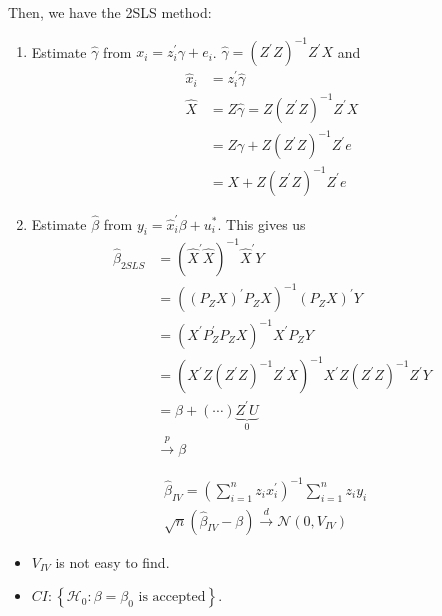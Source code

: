 \begin{eg}
    Then, we have the 2SLS method:
    \begin{enumerate}
        \item Estimate $\hat{\gamma}$ from $x_i = z_i^{\prime} \gamma + e_i$. $\hat{\gamma} = (Z^{\prime} Z)^{-1}Z^{\prime} X$ and 
            \begin{align*}
                \hat{x}_i &= z_i^{\prime} \hat{\gamma} \\
                \hat{X} &= Z \hat{\gamma} = Z(Z^{\prime} Z)^{-1}Z^{\prime} X \\
                &= Z \gamma + Z(Z^{\prime} Z)^{-1}Z^{\prime} e \\
                &= X + Z(Z^{\prime} Z)^{-1}Z^{\prime} e
            \end{align*}
        \item Estimate $\hat{\beta}$ from $y_i = \hat{x}_i^{\prime} \beta + u_i^*$. This gives us 
            \begin{align*}
                \hat{\beta}_{2SLS} &= \left( \hat{X}^{\prime} \hat{X} \right)^{-1} \hat{X}^{\prime} Y \\
                &= \left((P_Z X)^{\prime} P_Z X\right)^{-1} (P_Z X)^{\prime} Y \\
                &= \left(X^{\prime} P_Z^{\prime} P_Z X\right)^{-1} X^{\prime} P_Z Y \\
                &= \left(X^{\prime} Z(Z^{\prime} Z)^{-1} Z^{\prime} X\right)^{-1} X^{\prime} Z (Z^{\prime} Z)^{-1} Z^{\prime} Y \\
                &= \beta + (\cdots) \underset{0}{\underbrace{Z^{\prime} U}} \\
                &\stackrel{p}{\rightarrow} \beta
            \end{align*}
    \end{enumerate}
    \begin{align*}
        & \hat{\beta}_{IV} = \left( \sum_{i=1}^{n} z_i x_i^{\prime} \right)^{-1} \sum_{i=1}^{n} z_i y_i \\
        & \sqrt{n}(\hat{\beta}_{IV} - \beta) \xrightarrow{d} \mathcal{N}(0, V_{IV})
    \end{align*}
    \begin{itemize}
        \item $V_{IV}$ is not easy to find.
        \item $CI: \left\{ \mathcal{H}_0: \beta = \beta_0 \text{ is accepted} \right\}$.
    \end{itemize}
\end{eg}
